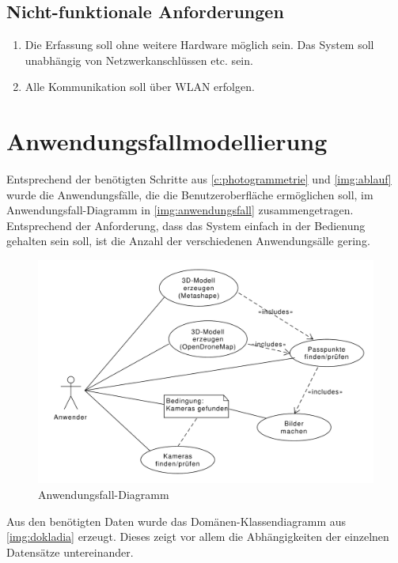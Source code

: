 \documentclass[./00PhotoBox.tex]{subfiles}
\begin{document}
\subsection{Nicht-funktionale Anforderungen}
\begin{enumerate}[label=N\arabic*]
    \item Die Erfassung soll ohne weitere Hardware möglich sein. Das System soll unabhängig von Netzwerkanschlüssen etc. sein.
    \item Alle Kommunikation soll über WLAN erfolgen.
\end{enumerate}

\section{Anwendungsfallmodellierung}
\label{sec:Anwendungsfallmodellierung}

Entsprechend der benötigten Schritte aus \autoref{c:photogrammetrie} und \autoref{img:ablauf} wurde die Anwendungsfälle, die die Benutzeroberfläche ermöglichen soll, im Anwendungsfall-Dia\-gramm in \autoref{img:anwendungsfall} zusammengetragen. Entsprechend der Anforderung, dass das System einfach in der Bedienung gehalten sein soll, ist die Anzahl der verschiedenen Anwendungsälle gering.

\begin{figure}
    \centering
    \includegraphics[width=1\textwidth]{./img/uml/uml_usecases.pdf}
    \caption{Anwendungsfall-Diagramm} %
    \label{img:anwendungsfall} %
\end{figure}

Aus den benötigten Daten wurde das Domänen-Klassendiagramm aus \autoref{img:dokladia} erzeugt. Dieses zeigt vor allem die Abhängigkeiten der einzelnen Datensätze untereinander.
\end{document}
